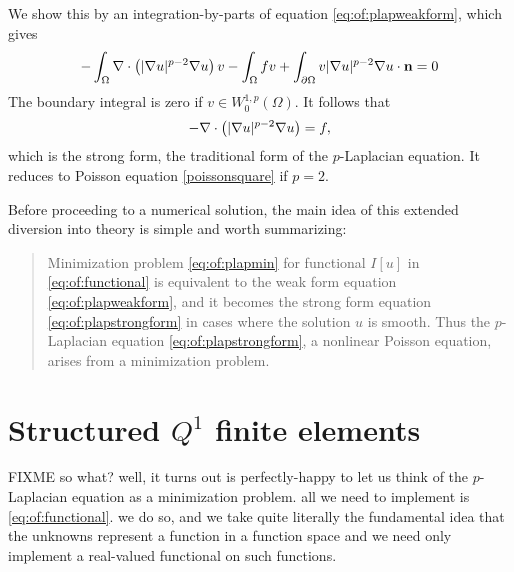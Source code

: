 We show this by an integration-by-parts \citep{Evans2010} of equation \eqref{eq:of:plapweakform}, which gives
    $$-\int_\Omega \nabla\cdot\left(|\nabla u|^{p-2} \nabla u\right) v - \int_\Omega f v + \int_{\partial \Omega} v |\nabla u|^{p-2} \nabla u \cdot \mathbf{n} = 0$$
The boundary integral is zero if $v\in W_0^{1,p}(\Omega)$.  It follows that
\begin{equation}
- \nabla\cdot\left(|\nabla u|^{p-2} \nabla u\right) = f,
\label{eq:of:plapstrongform}
\end{equation}
which is the strong form, the traditional form of the $p$-Laplacian equation.  It reduces to Poisson equation \eqref{poissonsquare} if $p=2$.

Before proceeding to a numerical solution, the main idea of this extended diversion into theory is simple and worth summarizing:
\begin{quote}
Minimization problem \eqref{eq:of:plapmin} for functional $I[u]$ in \eqref{eq:of:functional} is equivalent to the weak form equation \eqref{eq:of:plapweakform}, and it becomes the strong form equation \eqref{eq:of:plapstrongform} in cases where the solution $u$ is smooth.  Thus the $p$-Laplacian equation \eqref{eq:of:plapstrongform}, a nonlinear Poisson equation, arises from a minimization problem.
\end{quote}


\section{Structured $Q^1$ finite elements}

FIXME so what?  well, it turns out \PETSc is perfectly-happy to let us think of the $p$-Laplacian equation as a minimization problem.  all we need to implement is \eqref{eq:of:functional}.  we do so, and we take quite literally the fundamental idea that the unknowns represent a function in a function space and we need only implement a real-valued functional on such functions.


